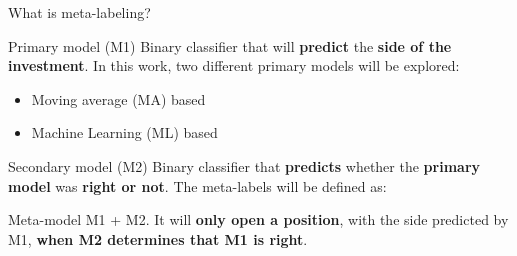 \documentclass[usenames,dvipsnames]{beamer} %
\begin{document}
%	
%
%	

\begin{frame}{What is meta-labeling?}
	\begin{block}{Primary model (M1)}
		Binary classifier that will \textbf{predict} the \textbf{side of the 
		investment}. In this work, two different primary models will be 
		explored:
		
		
		\begin{itemize}
			\item Moving average (MA) based
			\item Machine Learning (ML) based
		\end{itemize}
	\end{block}
	\begin{block}{Secondary model (M2)}
		Binary classifier that \textbf{predicts} whether the \textbf{primary 
		model} was \textbf{right or not}. The meta-labels will be defined as:
	\end{block}
	\begin{block}{Meta-model}
		M1 + M2. It will \textbf{only open a position}, with the side 
		predicted by M1, \textbf{when M2 determines that M1 is right}.
	\end{block}
\end{frame}
\end{document}
